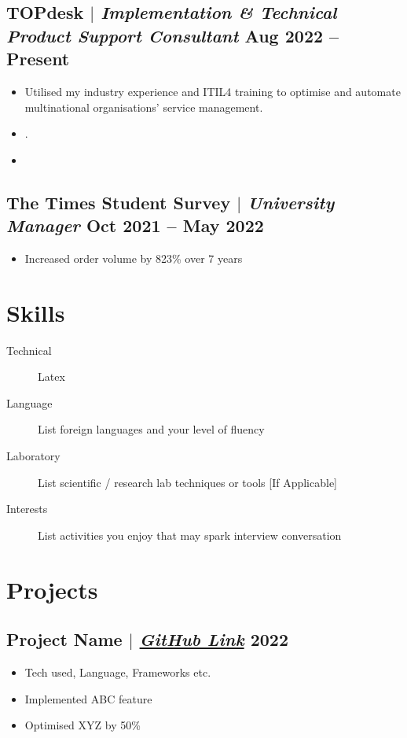 \documentclass[10pt]{article}
\begin{document}
\subsection{TOPdesk $|$ {\small\normalfont\textit{Implementation \& Technical Product Support Consultant}} \small\hfill Aug 2022 -- Present}
\begin{itemize}
    \item Utilised my industry experience and ITIL4 training to optimise and automate multinational organisations' service management. 
    \item . 
    \item 
\end{itemize}

\subsection{The Times Student Survey $|$ {\small\normalfont\textit{University Manager}} \small\hfill Oct 2021 -- May 2022}
\begin{itemize}
    \item Increased order volume by 823\% over 7 years 
\end{itemize}

\section{Skills}
\begin{description}
    \item[Technical] Latex 
    \item[Language] List foreign languages and your level of fluency
    \item[Laboratory] List scientific / research lab techniques or tools [If Applicable]
    \item[Interests] List activities you enjoy that may spark interview conversation
\end{description}

\section{Projects}
\subsection{Project Name {\normalfont $|$ \href{http://github.com}{\textit{GitHub Link}}} \hfill 2022}
\begin{itemize}
    \item Tech used, Language, Frameworks etc.
    \item Implemented ABC feature
    \item Optimised XYZ by 50\%
\end{itemize}
\end{document}
